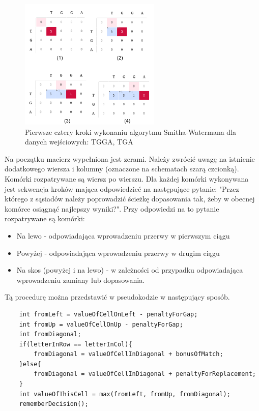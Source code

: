 \documentclass[a4paper,12pt]{article}
\newenvironment{lista}{
\begin{itemize}
  \setlength{\itemsep}{1pt}
  \setlength{\parskip}{0pt}
  \setlength{\parsep}{0pt}
}{\end{itemize}}
\begin{document}
\begin{figure}[H]
  \vspace{5pt}
  \centering
  \begin{center}
  \includegraphics[width=0.6\textwidth]{images/SchematDzialaniaAlgorytmu.png}
  \end{center}
  \caption{Pierwsze cztery kroki wykonaniu algorytmu Smitha-Watermana dla danych wejściowych: TGGA, TGA}
 \end{figure}

Na początku macierz wypełniona jest zerami. Należy zwrócić uwagę na istnienie dodatkowego wiersza i kolumny (oznaczone na schematach szarą czcionką). Komórki rozpatrywane są wiersz po wierszu. Dla każdej komórki wykonywana jest sekwencja kroków mająca odpowiedzieć na następujące pytanie: "Przez którego z sąsiadów należy poprowadzić ścieżkę dopasowania tak, żeby w obecnej komórce osiągnąć najlepszy wyniki?". Przy odpowiedzi na to pytanie rozpatrywane są komórki:
\begin{lista}
\item Na lewo - odpowiadająca wprowadzeniu przerwy w pierwszym ciągu
\item Powyżej - odpowiadająca wprowadzeniu przerwy w drugim ciągu
\item Na skos (powyżej i na lewo) - w zależności od przypadku odpowiadająca wprowadzeniu zamiany lub dopasowania.
\end{lista}

Tą procedurę można przedstawić w pseudokodzie w następujący sposób. 

\begin{lstlisting}
	int fromLeft = valueOfCellOnLeft - penaltyForGap;
	int fromUp = valueOfCellOnUp - penaltyForGap;
	int fromDiagonal;
	if(letterInRow == letterInCol){
		fromDiagonal = valueOfCellInDiagonal + bonusOfMatch;
	}else{
		fromDiagonal = valueOfCellInDiagonal + penaltyForReplacement;
	}
	int	valueOfThisCell = max(fromLeft, fromUp, fromDiagonal);
	rememberDecision();
\end{lstlisting}
\end{document}
